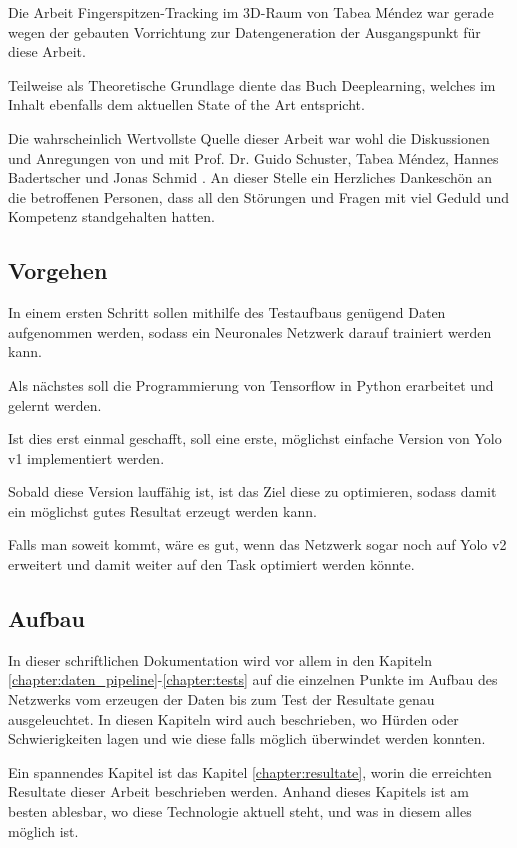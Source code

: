 Die Arbeit \grqq{}Fingerspitzen-Tracking im 3D-Raum\grqq{} von Tabea Méndez \cite{TabeasFingertracking} war gerade wegen der gebauten Vorrichtung zur Datengeneration der Ausgangspunkt für diese Arbeit.

Teilweise als Theoretische Grundlage diente das Buch Deeplearning\cite{deeplearning}, welches im Inhalt ebenfalls dem aktuellen State of the Art entspricht.

Die wahrscheinlich Wertvollste Quelle dieser Arbeit war wohl die Diskussionen und Anregungen von und mit Prof. Dr. Guido Schuster, Tabea Méndez, Hannes Badertscher und Jonas Schmid \cite{PrivateCommunication}. An dieser Stelle ein Herzliches Dankeschön an die betroffenen Personen, dass all den Störungen und Fragen mit viel Geduld und Kompetenz standgehalten hatten. 

\subsection{Vorgehen}
In einem ersten Schritt sollen mithilfe des Testaufbaus\cite{TabeasFingertracking} genügend Daten aufgenommen werden, sodass ein Neuronales Netzwerk darauf trainiert werden kann.

Als nächstes soll die Programmierung von Tensorflow in Python erarbeitet und gelernt werden.

Ist dies erst einmal geschafft, soll eine erste, möglichst einfache Version von Yolo v1\cite{yolo} implementiert werden.

Sobald diese Version lauffähig ist, ist das Ziel diese zu optimieren, sodass damit ein möglichst gutes Resultat erzeugt werden kann. 

Falls man soweit kommt, wäre es gut, wenn das Netzwerk sogar noch auf Yolo v2\cite{yolo2} erweitert und damit weiter auf den Task optimiert werden könnte.

\subsection{Aufbau}
In dieser schriftlichen Dokumentation wird vor allem in den Kapiteln \ref{chapter:daten_pipeline}-\ref{chapter:tests} auf die einzelnen Punkte im Aufbau des Netzwerks vom erzeugen der Daten bis zum Test der Resultate genau ausgeleuchtet.
In diesen Kapiteln wird auch beschrieben, wo Hürden oder Schwierigkeiten lagen und wie diese falls möglich überwindet werden konnten.

Ein spannendes Kapitel ist das Kapitel \ref{chapter:resultate}, worin die erreichten Resultate dieser Arbeit beschrieben werden.
Anhand dieses Kapitels ist am besten ablesbar, wo diese Technologie aktuell steht, und was in diesem alles möglich ist.

